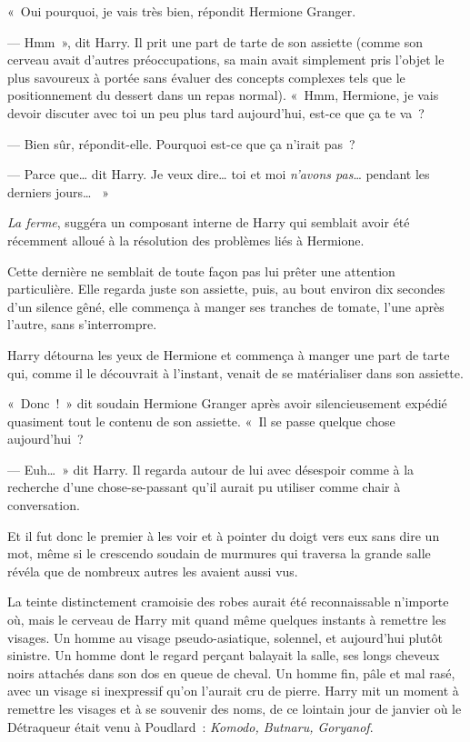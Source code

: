 «~Oui pourquoi, je vais très bien, répondit Hermione Granger.

--- Hmm~», dit Harry.
Il prit une part de tarte de son assiette (comme son cerveau avait d'autres préoccupations, sa main avait simplement pris l'objet le plus savoureux à portée sans évaluer des concepts complexes tels que le positionnement du dessert dans un repas normal).
«~Hmm, Hermione, je vais devoir discuter avec toi un peu plus tard aujourd'hui, est-ce que ça te va~?

--- Bien sûr, répondit-elle.
Pourquoi est-ce que ça n'irait pas~?

--- Parce que… dit Harry.
Je veux dire… toi et moi \emph{n'avons pas}… pendant les derniers jours… ~»

\emph{La ferme}, suggéra un composant interne de Harry qui semblait avoir été récemment alloué à la résolution des problèmes liés à Hermione.

Cette dernière ne semblait de toute façon pas lui prêter une attention particulière.
Elle regarda juste son assiette, puis, au bout environ dix secondes d'un silence gêné, elle commença à manger ses tranches de tomate, l'une après l'autre, sans s'interrompre.

Harry détourna les yeux de Hermione et commença à manger une part de tarte qui, comme il le découvrait à l'instant, venait de se matérialiser dans son assiette.

«~Donc~!~»
dit soudain Hermione Granger après avoir silencieusement expédié quasiment tout le contenu de son assiette.
«~Il se passe quelque chose aujourd'hui~?

--- Euh…~»
dit Harry.
Il regarda autour de lui avec désespoir comme à la recherche d'une chose-se-passant qu'il aurait pu utiliser comme chair à conversation.

Et il fut donc le premier à les voir et à pointer du doigt vers eux sans dire un mot, même si le crescendo soudain de murmures qui traversa la grande salle révéla que de nombreux autres les avaient aussi vus.

La teinte distinctement cramoisie des robes aurait été reconnaissable n'importe où, mais le cerveau de Harry mit quand même quelques instants à remettre les visages.
Un homme au visage pseudo-asiatique, solennel, et aujourd'hui plutôt sinistre.
Un homme dont le regard perçant balayait la salle, ses longs cheveux noirs attachés dans son dos en queue de cheval.
Un homme fin, pâle et mal rasé, avec un visage si inexpressif qu'on l'aurait cru de pierre.
Harry mit un moment à remettre les visages et à se souvenir des noms, de ce lointain jour de janvier où le Détraqueur était venu à Poudlard~: \emph{Komodo, Butnaru, Goryanof}.

